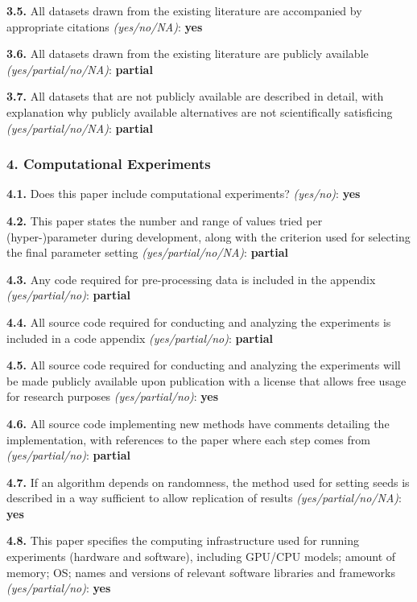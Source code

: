 \smallskip
\noindent\textbf{3.5.} All datasets drawn from the existing literature are accompanied by
appropriate citations \textit{(yes/no/NA)}: \textbf{yes}

\smallskip
\noindent\textbf{3.6.} All datasets drawn from the existing literature are publicly available
\textit{(yes/partial/no/NA)}: \textbf{partial}

\smallskip
\noindent\textbf{3.7.} All datasets that are not publicly available are described in detail,
with explanation why publicly available alternatives are not scientifically satisficing
\textit{(yes/partial/no/NA)}: \textbf{partial}

\subsubsection*{4. Computational Experiments}

\noindent\textbf{4.1.} Does this paper include computational experiments? \textit{(yes/no)}:
\textbf{yes}

\smallskip
\noindent\textbf{4.2.} This paper states the number and range of values tried per
(hyper-)parameter during development, along with the criterion used for selecting the final
parameter setting \textit{(yes/partial/no/NA)}: \textbf{partial}

\smallskip
\noindent\textbf{4.3.} Any code required for pre-processing data is included in the appendix
\textit{(yes/partial/no)}: \textbf{partial}

\smallskip
\noindent\textbf{4.4.} All source code required for conducting and analyzing the experiments
is included in a code appendix \textit{(yes/partial/no)}: \textbf{partial}

\smallskip
\noindent\textbf{4.5.} All source code required for conducting and analyzing the experiments
will be made publicly available upon publication with a license that allows free usage for
research purposes \textit{(yes/partial/no)}: \textbf{yes}

\smallskip
\noindent\textbf{4.6.} All source code implementing new methods have comments detailing the
implementation, with references to the paper where each step comes from
\textit{(yes/partial/no)}: \textbf{partial}

\smallskip
\noindent\textbf{4.7.} If an algorithm depends on randomness, the method used for setting seeds
is described in a way sufficient to allow replication of results
\textit{(yes/partial/no/NA)}: \textbf{yes}

\smallskip
\noindent\textbf{4.8.} This paper specifies the computing infrastructure used for running
experiments (hardware and software), including GPU/CPU models; amount of memory; OS; names and
versions of relevant software libraries and frameworks \textit{(yes/partial/no)}: \textbf{yes}

